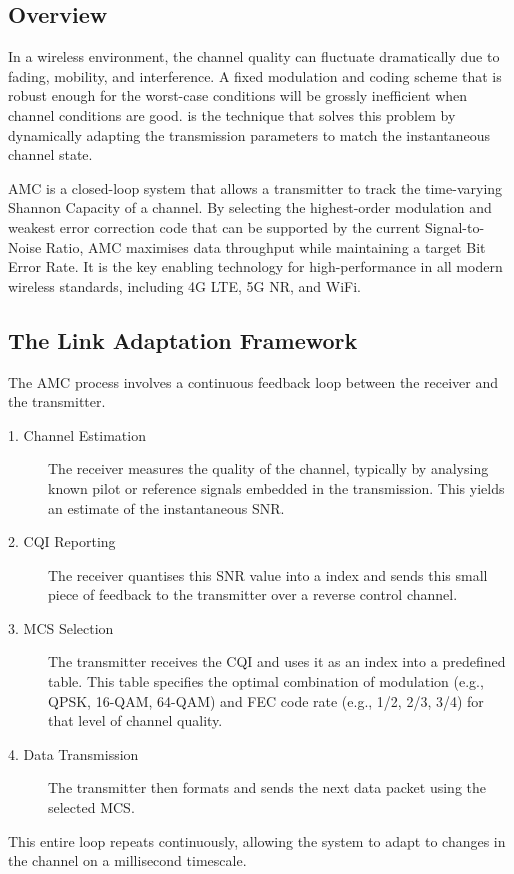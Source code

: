 \subsection{Overview}

In a wireless environment, the channel quality can fluctuate dramatically due to fading, mobility, and interference. A fixed modulation and coding scheme that is robust enough for the worst-case conditions will be grossly inefficient when channel conditions are good.  is the technique that solves this problem by dynamically adapting the transmission parameters to match the instantaneous channel state.

\begin{keyconcept}
    AMC is a closed-loop system that allows a transmitter to track the time-varying Shannon Capacity of a channel. By selecting the highest-order modulation and weakest error correction code that can be supported by the current Signal-to-Noise Ratio, AMC maximises data throughput while maintaining a target Bit Error Rate. It is the key enabling technology for high-performance in all modern wireless standards, including 4G LTE, 5G NR, and WiFi.
\end{keyconcept}


\subsection{The Link Adaptation Framework}

The AMC process involves a continuous feedback loop between the receiver and the transmitter.
\begin{description}
    \item[1. Channel Estimation] The receiver measures the quality of the channel, typically by analysing known pilot or reference signals embedded in the transmission. This yields an estimate of the instantaneous SNR.
    \item[2. CQI Reporting] The receiver quantises this SNR value into a  index and sends this small piece of feedback to the transmitter over a reverse control channel.
    \item[3. MCS Selection] The transmitter receives the CQI and uses it as an index into a predefined  table. This table specifies the optimal combination of modulation (e.g., QPSK, 16-QAM, 64-QAM) and FEC code rate (e.g., 1/2, 2/3, 3/4) for that level of channel quality.
    \item[4. Data Transmission] The transmitter then formats and sends the next data packet using the selected MCS.
\end{description}
This entire loop repeats continuously, allowing the system to adapt to changes in the channel on a millisecond timescale.


